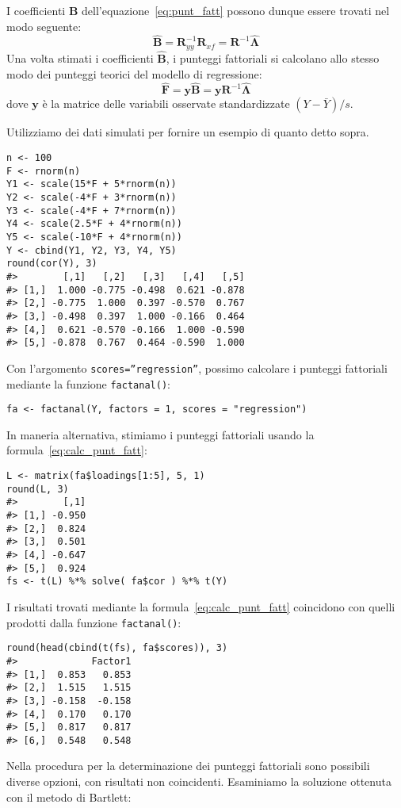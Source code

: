 I coefficienti \textbf{B} dell'equazione~\ref{eq:punt_fatt} possono dunque essere trovati nel modo seguente:
$$
\hat{\boldsymbol{B}} = \boldsymbol{R}_{yy}^{-1}\boldsymbol{R}_{xf}=
\boldsymbol{R}^{-1}\hat{\boldsymbol{\Lambda}}
$$
Una volta stimati i coefficienti $\hat{\textbf{B}}$, i punteggi
fattoriali si calcolano allo stesso modo dei punteggi
teorici del modello di regressione:
\begin{equation}
\hat{\textbf{F}} = \textbf{y} \hat{\textbf{B}} = \textbf{y}
\textbf{R}^{-1}\hat{\boldsymbol{\Lambda}}
\label{eq:calc_punt_fatt}
\end{equation}
dove $\boldsymbol{y}$ è la matrice delle variabili osservate
standardizzate $(Y-\bar{Y})/s$.

\begin{example}

Utilizziamo dei dati simulati per fornire un esempio di quanto detto sopra.

\begin{lstlisting}
n <- 100
F <- rnorm(n)
Y1 <- scale(15*F + 5*rnorm(n))
Y2 <- scale(-4*F + 3*rnorm(n))
Y3 <- scale(-4*F + 7*rnorm(n))
Y4 <- scale(2.5*F + 4*rnorm(n))
Y5 <- scale(-10*F + 4*rnorm(n))
Y <- cbind(Y1, Y2, Y3, Y4, Y5)
round(cor(Y), 3) 
#>        [,1]   [,2]   [,3]   [,4]   [,5]
#> [1,]  1.000 -0.775 -0.498  0.621 -0.878
#> [2,] -0.775  1.000  0.397 -0.570  0.767
#> [3,] -0.498  0.397  1.000 -0.166  0.464
#> [4,]  0.621 -0.570 -0.166  1.000 -0.590
#> [5,] -0.878  0.767  0.464 -0.590  1.000
\end{lstlisting}

Con l'argomento {\tt scores=''regression''}, possimo calcolare i punteggi fattoriali mediante la funzione {\tt factanal()}:

\begin{lstlisting}
fa <- factanal(Y, factors = 1, scores = "regression")
\end{lstlisting}
In maneria alternativa, stimiamo i punteggi fattoriali usando la formula~\ref{eq:calc_punt_fatt}:

\begin{lstlisting}
L <- matrix(fa$loadings[1:5], 5, 1)
round(L, 3)
#>        [,1]
#> [1,] -0.950
#> [2,]  0.824
#> [3,]  0.501
#> [4,] -0.647
#> [5,]  0.924
fs <- t(L) %*% solve( fa$cor ) %*% t(Y)
\end{lstlisting}
I risultati trovati mediante la formula~\ref{eq:calc_punt_fatt} coincidono con quelli prodotti dalla funzione {\tt factanal()}:

\begin{lstlisting}
round(head(cbind(t(fs), fa$scores)), 3)
#>             Factor1
#> [1,]  0.853   0.853
#> [2,]  1.515   1.515
#> [3,] -0.158  -0.158
#> [4,]  0.170   0.170
#> [5,]  0.817   0.817
#> [6,]  0.548   0.548
\end{lstlisting}
Nella  procedura per la determinazione dei punteggi fattoriali sono
possibili diverse opzioni, con risultati non coincidenti. 
Esaminiamo la soluzione ottenuta con il metodo di Bartlett:


\end{example}

